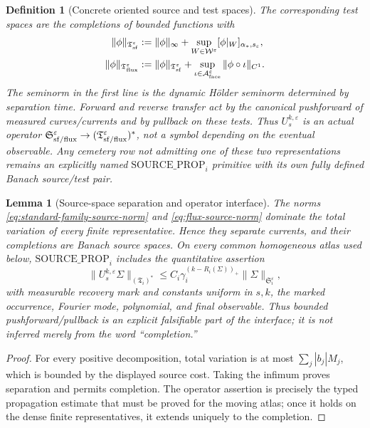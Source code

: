 \documentclass[11pt]{article}
\newtheorem{lemma}[theorem]{Lemma}
\newtheorem{definition}[theorem]{Definition}
\begin{document}
\begin{definition}[Concrete oriented source and test spaces]
The corresponding test spaces are the completions of bounded functions with
\begin{align}
 \|\phi\|_{\mathfrak T_{\rm sf}^{\varepsilon}}
 &:=\|\phi\|_\infty+
   \sup_{W\in\mathcal W^\varepsilon}
   [\phi|_W]_{\alpha_*,s_\varepsilon},
 \label{eq:standard-family-test-norm}\\
 \|\phi\|_{\mathfrak T_{\rm flux}^{\varepsilon}}
 &:=\|\phi\|_{\mathfrak T_{\rm sf}^{\varepsilon}}+
   \sup_{\iota\in\mathcal A_{\rm face}^\varepsilon}
   \|\phi\circ\iota\|_{C^1}.
 \label{eq:flux-test-norm}
\end{align}
The seminorm in the first line is the dynamic H\"older seminorm determined
by separation time.  Forward and reverse transfer act by the canonical
pushforward of measured curves/currents and by pullback on these tests.
Thus $U_s^{k,\varepsilon}$ is an actual operator
$\mathfrak S_{\rm sf/flux}^{\varepsilon}\to
(\mathfrak T_{\rm sf/flux}^{\varepsilon})^*$, not a symbol depending on the
eventual observable.  Any cemetery row not admitting one of these two
representations remains an explicitly named $\mathrm{SOURCE\_PROP}_i$
primitive with its own fully defined Banach source/test pair.
\end{definition}

\begin{lemma}[Source-space separation and operator interface]
\label{lem:source-space-operator-boundedness}
The norms \eqref{eq:standard-family-source-norm} and
\eqref{eq:flux-source-norm} dominate the total variation of every finite
representative.  Hence they separate currents, and their completions are
Banach source spaces.  On every common homogeneous atlas used below,
$\mathrm{SOURCE\_PROP}_i$ includes the quantitative assertion
\begin{equation}
\label{eq:source-operator-boundedness}
 \|U_s^{k,\varepsilon}\Sigma\|_{(\mathfrak T_i)^*}
 \le C_i\gamma_i^{(k-R_i(\Sigma))_+}
       \|\Sigma\|_{\mathfrak S_i^\varepsilon},
\end{equation}
with measurable recovery mark and constants uniform in $s,k$, the marked
occurrence, Fourier mode, polynomial, and final observable.  Thus bounded
pushforward/pullback is an explicit falsifiable part of the interface; it is
not inferred merely from the word ``completion.''
\end{lemma}

\begin{proof}
For every positive decomposition, total variation is at most
$\sum_j|b_j|M_j$, which is bounded by the displayed source cost.  Taking the
infimum proves separation and permits completion.  The operator assertion is
precisely the typed propagation estimate that must be proved for the moving
atlas; once it holds on the dense finite representatives, it extends
uniquely to the completion.
\end{proof}
\end{document}
